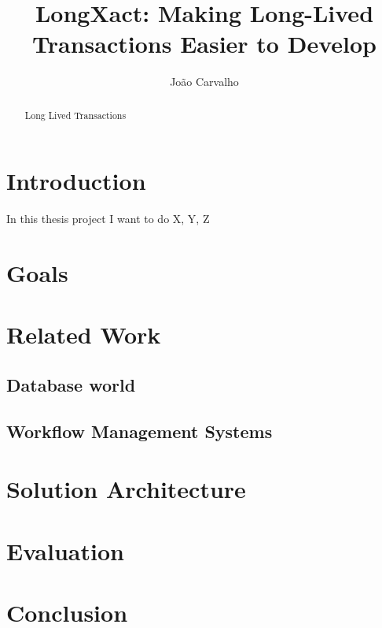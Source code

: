 \documentclass{llncs}
\begin{document}
\title{LongXact: Making Long-Lived Transactions Easier to Develop}

\author{João Carvalho}
\maketitle


\begin{abstract}
Long Lived Transactions 
\end{abstract}


\section{Introduction}

In this thesis project I want to do X, Y, Z

\section{Goals}

\section{Related Work}

\subsection{Database world}

\subsection{Workflow Management Systems}

\section{Solution Architecture}

\cite{fowler2003patterns}

\section{Evaluation}

\section{Conclusion}



\end{document}
